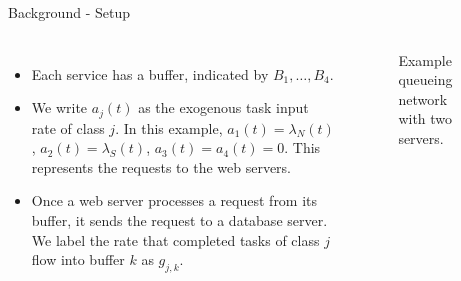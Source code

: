 \documentclass[pdf]{beamer}
\theoremstyle{definition}
\begin{document}
\begin{frame}{Background - Setup}
    \begin{columns}

        \begin{itemize}
            \item Each service has a buffer,
            indicated by $B_1, \ldots, B_4$.
            \item We write $a_j(t)$ as the exogenous task input rate of class $j$.
            In this example,
            $a_1(t) = \lambda_N(t)$, $a_2(t) = \lambda_S(t)$,
            $a_3(t) = a_4(t) = 0$.
            This represents the requests to the web servers.
            \item Once a web server processes a request from its buffer,
            it sends the request to a database server.
            We label the rate that completed tasks of class
            $j$ flow into buffer $k$ as
            $g_{j,k}$.
        \end{itemize}

        \begin{figure}
            \centering
            \caption[Example queueing network with two servers.]{
                \label{fig:queue-net}
                Example queueing network with two servers.
            }
        \end{figure}

    \end{columns}

\end{frame}
\end{document}
